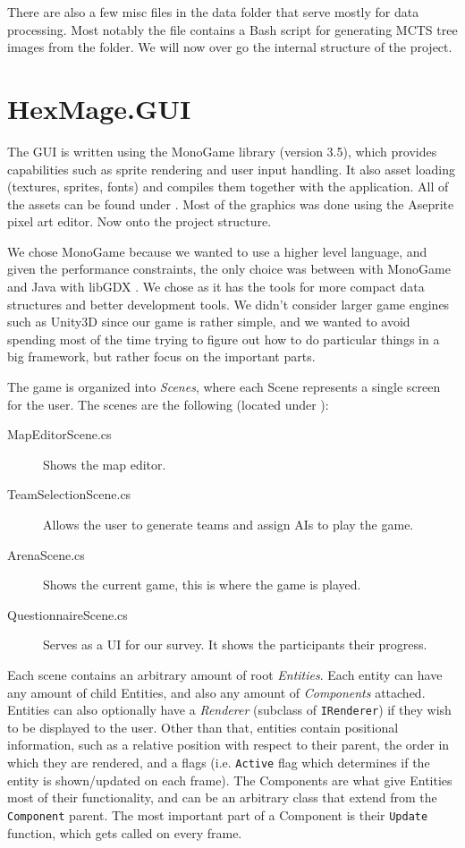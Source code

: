 There are also a few misc files in the data folder that serve mostly for data processing. Most notably the  file contains a Bash \citep{bash} script for generating MCTS tree images from the  folder. We will now over go the internal structure of the project.

\section{HexMage.GUI}

The GUI is written using the MonoGame \citep{monogame} library (version 3.5), which provides capabilities such as sprite rendering and user input handling. It also asset loading (textures, sprites, fonts) and compiles them together with the application. All of the assets can be found under . Most of the graphics was done using the Aseprite \citep{aseprite} pixel art editor. Now onto the project structure.

We chose MonoGame because we wanted to use a higher level language, and given the performance constraints, the only choice was between \Csh with MonoGame and Java with libGDX \citep{libgdx}. We chose \Csh as it has the tools for more compact data structures and better development tools. We didn't consider larger game engines such as Unity3D \citep{unity3d} since our game is rather simple, and we wanted to avoid spending most of the time trying to figure out how to do particular things in a big framework, but rather focus on the important parts.

The game is organized into \emph{Scenes}, where each Scene represents a single screen for the user. The scenes are the following (located under ):

\begin{description}
	\item[MapEditorScene.cs] Shows the map editor.
	\item[TeamSelectionScene.cs] Allows the user to generate teams and assign AIs to play the game.
	\item[ArenaScene.cs] Shows the current game, this is where the game is played.
	\item[QuestionnaireScene.cs] Serves as a UI for our survey. It shows the participants their progress.
\end{description}

Each scene contains an arbitrary amount of root \emph{Entities}. Each entity can have any amount of child Entities, and also any amount of \emph{Components} attached. Entities can also optionally have a \emph{Renderer} (subclass of \verb|IRenderer|) if they wish to be displayed to the user. Other than that, entities contain positional information, such as a relative position with respect to their parent, the order in which they are rendered, and a flags (i.e. \verb|Active| flag which determines if the entity is shown/updated on each frame). The Components are what give Entities most of their functionality, and can be an arbitrary class that extend from the \verb|Component| parent. The most important part of a Component is their \verb|Update| function, which gets called on every frame.

